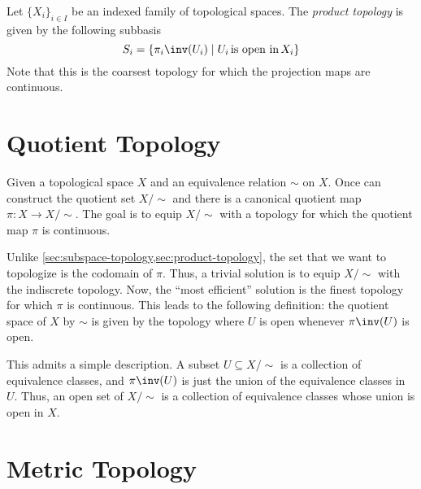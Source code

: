 \documentclass{amsart}
\begin{document}
\begin{defn}
  Let $\{X_{i}\}_{i \in I}$ be an indexed family of topological spaces.
  The \emph{product topology} is given by the following subbasis
  \[
    S_{i} = \{\pi_{i}\inv(U_{i}) \mid U_{i}\,\text{is open in}\,X_{i}\}
  \]
  Note that this is the coarsest topology for which the projection maps are continuous.
\end{defn}

\section{Quotient Topology}
\label{sec:quotient-topology}

Given a topological space $X$ and an equivalence relation $\sim$ on $X$.
Once can construct the quotient set $X/\sim$ and there is a canonical quotient map $\pi : X \to X/\sim$.
The goal is to equip $X/\sim$ with a topology for which the quotient map $\pi$ is continuous.

Unlike \cref{sec:subspace-topology,sec:product-topology}, the set that we want to topologize is the codomain of $\pi$.
Thus, a trivial solution is to equip $X/\sim$ with the indiscrete topology.
Now, the ``most efficient'' solution is the finest topology for which $\pi$ is continuous.
This leads to the following definition: the quotient space of $X$ by $\sim$ is given by the topology where $U$ is open whenever $\pi\inv(U)$ is open.

This admits a simple description.
A subset $U \subseteq X/\sim$ is a collection of equivalence classes, and $\pi\inv(U)$ is just the union of the equivalence classes in $U$.
Thus, an open set of $X/\sim$ is a collection of equivalence classes whose union is open in $X$.

\section{Metric Topology}
\label{sec:metric-topology}
\end{document}

